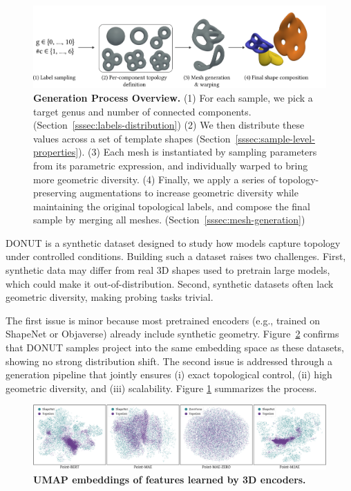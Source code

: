 \begin{figure}[h]
  \centering
  \includegraphics[width=1.0\linewidth]{figs/topogen/topogen_gen.pdf}
   \caption{\textbf{Generation Process Overview.} (1) For each sample, we pick a target genus and number of connected components. (Section~\ref{sssec:labels-distribution}) (2) We then distribute these values across a set of template shapes (Section~\ref{sssec:sample-level-properties}). (3) Each mesh is instantiated by sampling parameters from its parametric expression, and individually warped to bring more geometric diversity. (4) Finally, we apply a series of topology-preserving augmentations to increase geometric diversity while maintaining the original topological labels, and compose the final sample by merging all meshes. (Section~\ref{sssec:mesh-generation})}
   \label{fig:topogen-overview}
\end{figure}

DONUT is a synthetic dataset designed to study how models capture topology under controlled conditions. Building such a dataset raises two challenges. First, synthetic data may differ from real 3D shapes used to pretrain large models, which could make it out-of-distribution. Second, synthetic datasets often lack geometric diversity, making probing tasks trivial.

The first issue is minor because most pretrained encoders (e.g., trained on ShapeNet or Objaverse) already include synthetic geometry. Figure~\ref{fig:topogen-umaps-overview} confirms that DONUT samples project into the same embedding space as these datasets, showing no strong distribution shift. The second issue is addressed through a generation pipeline that jointly ensures (i) exact topological control, (ii) high geometric diversity, and (iii) scalability. Figure \ref{fig:topogen-overview} summarizes the process.

\begin{figure}[h]
  \centering
  \includegraphics[width=\linewidth]{figs/topogen/umaps_overview.pdf}
  \caption{\textbf{UMAP embeddings of features learned by 3D encoders.}}
  \label{fig:topogen-umaps-overview}
\end{figure}


